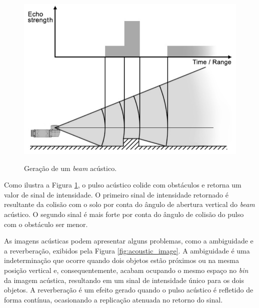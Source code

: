 \begin{figure}[H]
    \centering
    \caption{Geração de um \textit{beam} acústico.}
    \includegraphics[scale=0.4]{dados/figuras/acoustic_beam.png}
    \label{fig:acoustic_beam}
\end{figure}

Como ilustra a Figura \ref{fig:acoustic_beam}, o pulso acústico colide com obstáculos e retorna um valor de sinal de intensidade. 
O primeiro sinal de intensidade retornado é resultante da colisão com o solo por conta do ângulo de abertura vertical do \textit{beam} acústico.
O segundo sinal é mais forte por conta do ângulo de colisão do pulso com o obstáculo ser menor.

As imagens acústicas podem apresentar alguns problemas, como a ambiguidade e a reverberação, exibidos pela Figura \ref{fig:acoustic_image}. 
A ambiguidade é uma indeterminação que ocorre quando dois objetos estão próximos ou na mesma posição vertical e, consequentemente, acabam ocupando o mesmo espaço no \textit{bin} da imagem acústica, resultando em um sinal de intensidade único para os dois objetos.
A reverberação é um efeito gerado quando o pulso acústico é refletido de forma contínua, ocasionando a replicação atenuada no retorno do sinal.


